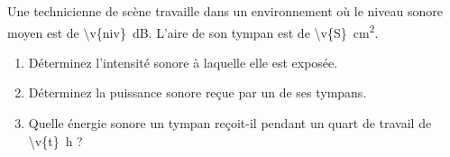 Une technicienne de scène travaille dans un environnement où le niveau sonore moyen est de \qty{\v{niv}}{dB}. L'aire de son tympan est de \qty{\v{S}}{cm^2}.

\begin{enumerate}[label=\alph*)]
    \item Déterminez l'intensité sonore à laquelle elle est exposée.
    \item Déterminez la puissance sonore reçue par un de ses tympans.
    \item Quelle énergie sonore un tympan reçoit-il pendant un quart de travail de \qty{\v{t}}{h} ?
\end{enumerate}
